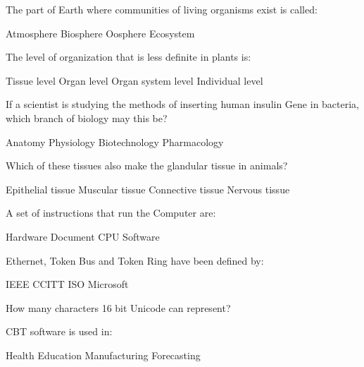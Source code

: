 \documentclass{exam}
\begin{document}
\begin{questions}
The part of Earth where communities of living organisms exist is called:\\
\begin{oneparchoices}
\choice Atmosphere
\choice Biosphere
\choice Oosphere
\choice Ecosystem
\end{oneparchoices}
\question 

The level of organization that is less definite in plants is:\\
\begin{oneparchoices}
\choice Tissue level
\choice Organ level
\choice Organ system level
\choice Individual level
\end{oneparchoices}
\question 

If a scientist is studying the methods of inserting human insulin Gene in bacteria, which branch of biology may this be?\\
\begin{oneparchoices}
\choice Anatomy
\choice Physiology
\choice Biotechnology
\choice Pharmacology
\end{oneparchoices}
\question 

Which of these tissues also make the glandular tissue in animals?\\
\begin{oneparchoices}
\choice Epithelial tissue
\choice Muscular tissue
\choice Connective tissue
\choice Nervous tissue
\end{oneparchoices}
\question 

A set of instructions that run the Computer are:\\
\begin{oneparchoices}
\choice Hardware
\choice Document
\choice CPU
\choice Software
\end{oneparchoices}
\question 

Ethernet, Token Bus and Token Ring have been defined by:\\
\begin{oneparchoices}
\choice IEEE
\choice CCITT
\choice ISO
\choice Microsoft
\end{oneparchoices}
\question 

How many characters 16 bit Unicode can represent?\\
\begin{oneparchoices}
\end{oneparchoices}
\question 

CBT software is used in:\\
\begin{oneparchoices}
\choice Health
\choice Education
\choice Manufacturing
\choice Forecasting
\end{oneparchoices}
\question 


\end{questions}
\end{document}
